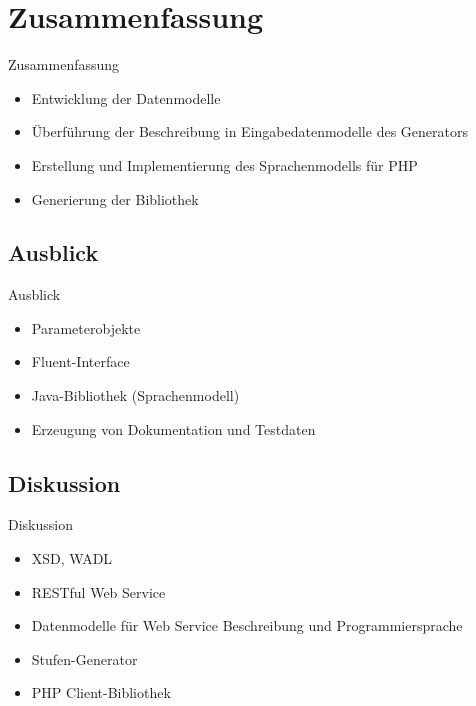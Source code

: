\section{Zusammenfassung}

\begin{frame}{Zusammenfassung}
    \begin{itemize}
        \item Entwicklung der Datenmodelle
        \item Überführung der Beschreibung in Eingabedatenmodelle des Generators
        \item Erstellung und Implementierung des Sprachenmodells für PHP
        \item Generierung der Bibliothek
    \end{itemize}
\end{frame}

\subsection{Ausblick}
\begin{frame}{Ausblick}
    \begin{itemize}
        \item Parameterobjekte
        \item Fluent-Interface
        \item Java-Bibliothek (Sprachenmodell)
        \item Erzeugung von Dokumentation und Testdaten
    \end{itemize}
\end{frame}

\subsection{Diskussion}
\begin{frame}{Diskussion}
    \begin{itemize}
        \item XSD, WADL
        \item RESTful Web Service
        \item Datenmodelle für Web Service Beschreibung und Programmiersprache
        \item Stufen-Generator
        \item PHP Client-Bibliothek
    \end{itemize}
\end{frame}